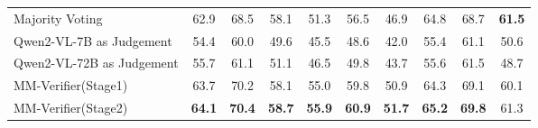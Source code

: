 \begin{table*}[htbp]
{\begin{tabular}{l||c|c|c||c|c|c||c|c|c}
    \midrule
    \rowcolor[rgb]{ .851,  .882,  .949} \multicolumn{10}{c}{\footnotesize \textit{Sample 12}} \\
    \midrule
    Majority Voting & 62.9  & 68.5  & 58.1  & 51.3  & 56.5  & 46.9  & 64.8  & 68.7  & \textbf{61.5} \\
    Qwen2-VL-7B as Judgement & 54.4  & 60.0  & 49.6  & 45.5  & 48.6  & 42.0  & 55.4  & 61.1  & 50.6 \\
    Qwen2-VL-72B as Judgement & 55.7 & 61.1 & 51.1 & 46.5 & 49.8 & 43.7 & 55.6 & 61.5 & 48.7 \\
    MM-Verifier(Stage1) & 63.7  & 70.2  & 58.1  & 55.0  & 59.8  & 50.9  & 64.3  & 69.1  & 60.1 \\
    MM-Verifier(Stage2) & \textbf{64.1}  & \textbf{70.4}  & \textbf{58.7}  & \textbf{55.9}  & \textbf{60.9}  & \textbf{51.7}  & \textbf{65.2}  & \textbf{69.8}  & 61.3 \\
    \bottomrule
    \end{tabular}%
    }
  \label{tab:abla_mathvista}%
  \vspace{-4mm}
\end{table*}%
